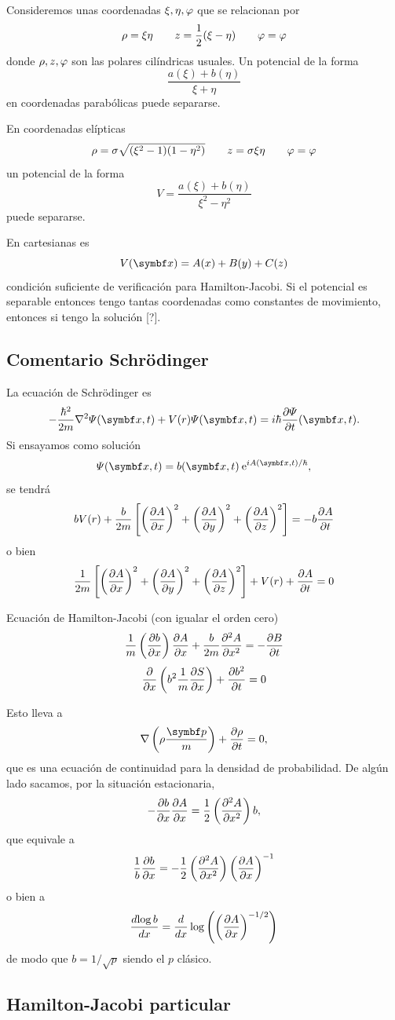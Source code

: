 \documentclass[10pt,oneside]{CBFT_book}
\begin{document}
Consideremos unas coordenadas $\xi,\eta,\vp$ que se relacionan por
\[
	\rho = \xi \eta \qquad z = \frac{1}{2}( \xi - \eta ) \qquad \vp = \vp
\]
donde $\rho,z,\vp$ son las polares cilíndricas usuales.
Un potencial de la forma 
\[
	\frac{ a(\xi) + b( \eta ) }{ \xi + \eta }
\]
en coordenadas parabólicas puede separarse.

En coordenadas elípticas
\[
	\rho = \sigma \sqrt{ ( \xi^2 - 1 )( 1 - \eta^2 ) } \qquad z = \sigma \xi \eta \qquad \vp = \vp
\]
un potencial de la forma 
\[
	V = \frac{ a(\xi) + b( \eta ) }{ \xi^2 - \eta^2 }
\]
puede separarse.

En cartesianas es
\[
	V(\vb{x}) = A(x) + B(y) + C(z)
\]
condición suficiente de verificación para Hamilton-Jacobi. Si el potencial es separable entonces tengo tantas coordenadas como 
constantes de movimiento, entonces si tengo la solución [?].

\subsection{Comentario Schrödinger}

La ecuación de Schrödinger es
\[
	- \frac{\hbar^2}{2m} \nabla^2 \Psi(\vb{x},t) + V(r) \Psi(\vb{x},t) = i \hbar  \dpar{\Psi}{t} (\vb{x},t).
\]
Si ensayamos como solución 
\[
	\Psi(\vb{x},t) = b(\vb{x},t)  \euler^{i A(\vb{x},t) / \hbar},
\]
se tendrá 
\[
	b V(r) + \frac{b}{2m} \left[ \Dpar{A}{x}^2 + \Dpar{A}{y}^2 + \Dpar{A}{z}^2 \right] = - b \dpar{A}{t}
\]
o bien 
\[
	\frac{1}{2m} \left[ \Dpar{A}{x}^2 + \Dpar{A}{y}^2 + \Dpar{A}{z}^2 \right] + V(r) + \dpar{A}{t} = 0
\]

Ecuación de Hamilton-Jacobi (con igualar el orden cero)
\[
	\frac{1}{m} \Dpar{b}{x} \dpar{A}{x} + \frac{b}{2m} \dpar[2]{A}{x} = - \dpar{B}{t}
\]
\[
	\dpar{}{x}\left( b^2 \frac{1}{m} \dpar{S}{x} \right) + \dpar{b^2}{t} = 0
\]

Esto lleva a 
\[
	\nabla \left( \rho \frac{\vb{p}}{m} \right) + \dpar{\rho}{t} = 0,
\]
que es una ecuación de continuidad para la densidad de probabilidad.
De algún lado sacamos, por la situación estacionaria,
\[
	- \dpar{b}{x} \dpar{A}{x} = \frac{1}{2} \Dpar[2]{A}{x} b,
\]
que equivale a 
\[
	\frac{1}{b} \dpar{b}{x} = - \frac 1 2 \Dpar[2]{A}{x} \Dpar{A}{x}^{-1}
\]
o bien a 
\[
	\dtot{\log b}{x} = \dtot{}{x} \log\left( \Dpar{A}{x}^{-1/2} \right)
\]
de modo que $b = 1 / \sqrt{p}$ siendo el $p$ clásico.


\subsection{Hamilton-Jacobi particular}
\end{document}
